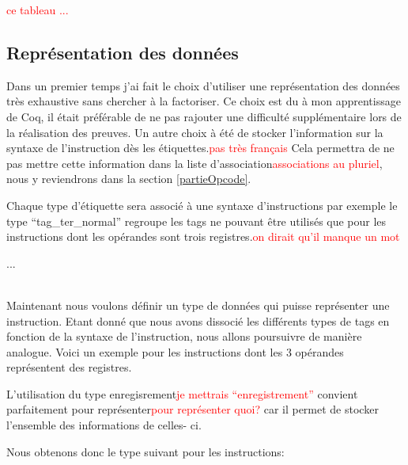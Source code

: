 \documentclass {article}
\newcommand{\codefrom}[3]
           {}
\theoremstyle{definition}
\theoremstyle{remark}
\newcommand{\todo}[1]{\textcolor{red}{#1}}
\begin{document}
\todo{ce tableau ...}



\subsection{Représentation des données}
\label{representation des donnees}

Dans un premier temps j'ai fait le choix d'utiliser une représentation des données très exhaustive sans
chercher à la factoriser. Ce choix est du à mon apprentissage de Coq, il était préférable de ne pas
rajouter une difficulté supplémentaire lors de la réalisation des preuves.
Un autre choix à été de stocker l'information sur la syntaxe de l'instruction dès les étiquettes.\todo{pas très français}
Cela permettra de ne pas mettre cette information dans la liste d'association\todo{associations au pluriel}, nous y reviendrons dans la
section \ref{partieOpcode}.

\codefrom{src}{ast_instructions}{tag}

Chaque type d'étiquette sera associé à une syntaxe d'instructions par exemple le type ``tag\_ter\_normal''
regroupe les tags ne pouvant être utilisés que pour les instructions dont les opérandes sont trois registres.\todo{on dirait qu'il manque un mot}

\codefrom{src}{ast_instructions}{tag_definition}
...

\\ 

Maintenant nous voulons définir un type de données qui puisse représenter une instruction.
Etant donné que nous avons dissocié les différents types de tags en fonction de la syntaxe de l'instruction,
nous allons poursuivre de manière analogue.
Voici un exemple pour les instructions dont les 3 opérandes représentent des registres.

\codefrom{src}{ast_instructions}{instruction_tern_n}

L'utilisation du type enregisrement\todo{je mettrais ``enregistrement''} convient parfaitement pour représenter\todo{pour représenter quoi?} car il permet de stocker
l'ensemble des informations de celles- ci.

Nous obtenons donc le type suivant pour les instructions:
\codefrom{src}{ast_instructions}{instruction}
\end{document}

